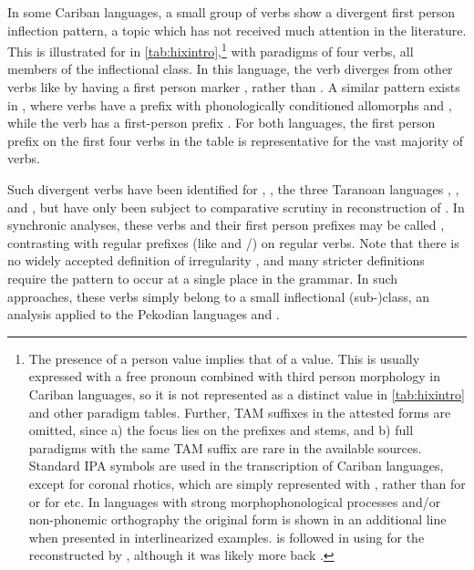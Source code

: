 In some Cariban languages, a small group of verbs show a divergent first person inflection pattern, a topic which has not received much attention in the literature.
This is illustrated for \hixka in \cref{tab:hixintro},\footnote{The presence of a  person value implies that of a  value.
This is usually expressed with a free pronoun combined with third person morphology in Cariban languages, so it is not represented as a distinct value in \cref{tab:hixintro} and other paradigm tables.
Further, TAM suffixes in the attested forms are omitted, since a) the focus lies on the prefixes and stems, and b) full paradigms with the same TAM suffix are rare in the available sources.
Standard IPA symbols are used in the transcription of Cariban languages, except for coronal rhotics, which are simply represented with , rather than  for \wayana or  for \maqui etc.
In languages with strong morphophonological processes and/or non-phonemic orthography the original form is shown in an additional line when presented in interlinearized examples.
\textcite{gildea2018reconstructing} is followed in using  for the \PC reconstructed by \textcite{meira2005southern}, although it was likely more back \parencite{gildea2010story}.}
with paradigms of four verbs, all members of the  inflectional class.
In this language, the verb  diverges from other  verbs like  by having a first person marker , rather than .
A similar pattern exists in \trio {}, where  verbs have a prefix with phonologically conditioned allomorphs  and , while the verb  has a first-person prefix .
For both languages, the first person prefix on the first four verbs in the table is representative for the vast majority of  verbs.

Such divergent verbs have been identified for \hixka \parencite[188]{hixkaryanaderby1985}, \waiwai \parencite[90]{gildea1998}, the three Taranoan languages \parencite[112--115]{meira1998proto}, \bakairi \parencite{meira2003bakairi}, and \arara \parencite[153]{alves2017arara}, but have only been subject to comparative scrutiny in  reconstruction of \PTar.
In synchronic analyses, these verbs and their first person prefixes may be called , contrasting with regular prefixes (like \hixka {} and \trio {}/) on regular verbs.
Note that there is no widely accepted definition of irregularity \parencite{stolz2012introduction}, and many stricter definitions \parencite[e.g.,][]{haspelmath2010understanding} require the pattern to occur at a single place in the grammar.
In such approaches, these verbs simply belong to a small inflectional (sub-)class, an analysis applied to the Pekodian languages \bakairi and \arara \parencites[4]{meira2003bakairi}[149]{alves2017arara}.

